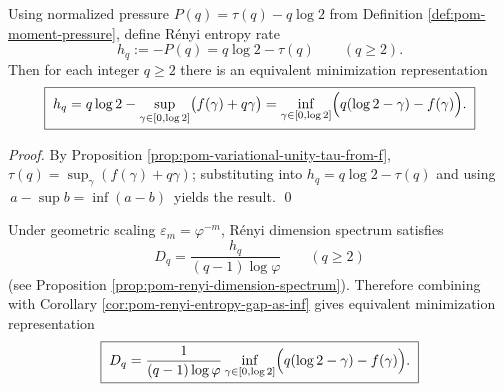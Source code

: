 \begin{corollary}\label{cor:pom-renyi-entropy-gap-as-inf}
Using normalized pressure \(P(q)=\tau(q)-q\log 2\) from Definition \ref{def:pom-moment-pressure}, define Rényi entropy rate
\[
h_q:=-P(q)=q\log 2-\tau(q)\qquad(q\ge 2).
\]
Then for each integer \(q\ge 2\) there is an equivalent minimization representation
\[
\boxed{\;
h_q
=q\log 2-\sup_{\gamma\in[0,\log 2]}\bigl(f(\gamma)+q\gamma\bigr)
=\inf_{\gamma\in[0,\log 2]}\Bigl(q(\log 2-\gamma)-f(\gamma)\Bigr).\;}
\]
\end{corollary}
\begin{proof}
By Proposition \ref{prop:pom-variational-unity-tau-from-f},
\(
\tau(q)=\sup_{\gamma}(f(\gamma)+q\gamma)
\);
substituting into \(h_q=q\log 2-\tau(q)\) and using \(\,a-\sup b=\inf(a-b)\,\) yields the result. \qed
\end{proof}

\begin{corollary}\label{cor:pom-dimension-spectrum-gap-min-principle}
Under geometric scaling \(\varepsilon_m=\varphi^{-m}\), Rényi dimension spectrum satisfies
\[
D_q=\frac{h_q}{(q-1)\log\varphi}\qquad(q\ge 2)
\]
(see Proposition \ref{prop:pom-renyi-dimension-spectrum}).
Therefore combining with Corollary \ref{cor:pom-renyi-entropy-gap-as-inf} gives equivalent minimization representation
\[
\boxed{\;
D_q
=\frac{1}{(q-1)\log\varphi}\inf_{\gamma\in[0,\log 2]}
\Bigl(q(\log 2-\gamma)-f(\gamma)\Bigr).\;}
\]
\end{corollary}

